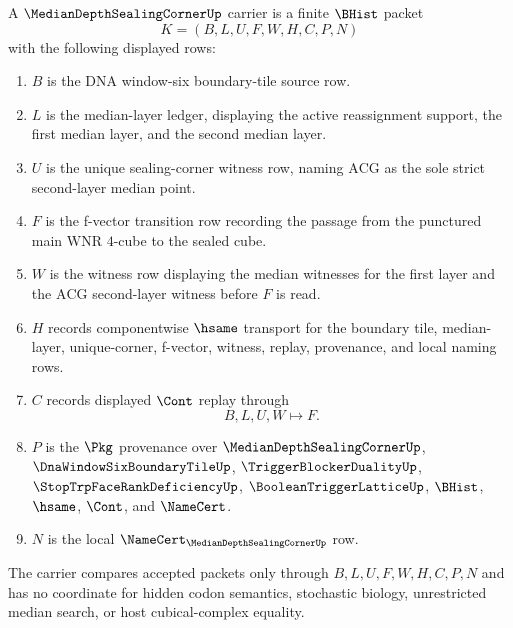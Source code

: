 \begin{definition}
\label{def:median-depth-sealing-corner-carrier}
A $\MedianDepthSealingCornerUp$ carrier is a finite $\BHist$ packet
$$
K=(B,L,U,F,W,H,C,P,N)
$$
with the following displayed rows:
\begin{enumerate}
\item $B$ is the DNA window-six boundary-tile source row.
\item $L$ is the median-layer ledger, displaying the active reassignment support, the first median layer, and the second median layer.
\item $U$ is the unique sealing-corner witness row, naming $\mathrm{ACG}$ as the sole strict second-layer median point.
\item $F$ is the f-vector transition row recording the passage from the punctured main $\mathrm{WNR}$ $4$-cube to the sealed cube.
\item $W$ is the witness row displaying the median witnesses for the first layer and the $\mathrm{ACG}$ second-layer witness before $F$ is read.
\item $H$ records componentwise $\hsame$ transport for the boundary tile, median-layer, unique-corner, f-vector, witness, replay, provenance, and local naming rows.
\item $C$ records displayed $\Cont$ replay through
$$
B,L,U,W \longmapsto F .
$$
\item $P$ is the $\Pkg$ provenance over $\MedianDepthSealingCornerUp$, $\DnaWindowSixBoundaryTileUp$, $\TriggerBlockerDualityUp$, $\StopTrpFaceRankDeficiencyUp$, $\BooleanTriggerLatticeUp$, $\BHist$, $\hsame$, $\Cont$, and $\NameCert$.
\item $N$ is the local $\NameCert_{\MedianDepthSealingCornerUp}$ row.
\end{enumerate}
The carrier compares accepted packets only through $B,L,U,F,W,H,C,P,N$ and has no coordinate for hidden codon semantics, stochastic biology, unrestricted median search, or host cubical-complex equality.
\end{definition}

